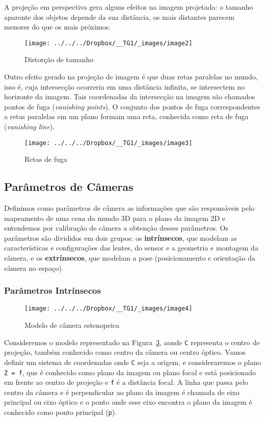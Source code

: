 \documentclass[ecp,tc]{iiufrgs}
\begin{document}
A projeção em perspectiva gera alguns efeitos na imagem projetada: o tamanho aparente dos objetos depende da sua distância, os mais distantes parecem menores do que os mais próximos.

\begin{figure}
	\centering
	\caption{Distorção de tamanho}
	\texttt{[image: ../../../Dropbox/\_\_TG1/\_images/image2]}
	\label{fig:image2}
\end{figure}

Outro efeito gerado na projeção de imagem é que duas retas paralelas no mundo, isso é, cuja intersecção ocorreria em uma distância infinita, se intersectem no horizonte da imagem. Tais coordenadas da intersecção na imagem são chamados pontos de fuga (\textit{vanishing points}). O conjunto dos pontos de fuga correspondentes a retas paralelas em um plano formam uma reta, conhecida como reta de fuga (\textit{vanishing line}).

\begin{figure}
	\centering
	\caption{Retas de fuga}
	\texttt{[image: ../../../Dropbox/\_\_TG1/\_images/image3]}
	\label{fig:image3}
\end{figure}

\subsection{Parâmetros de Câmeras}
Definimos como parâmetros de câmera as informações que são responsáveis pelo mapeamento de uma cena do mundo 3D para o plano da imagem 2D e entendemos por calibração de câmera a obtenção desses parâmetros. Os parâmetros são divididos em dois grupos: os \textbf{intrínsecos}, que modelam as características e configurações das lentes, do sensor e a geometria e montagem da câmera, e os \textbf{extrínsecos}, que modelam a pose (posicionamento e orientação da câmera no espaço).

\subsubsection{Parâmetros Intrínsecos}

\begin{figure}
	\centering
	\caption{Modelo de câmera estenopeica}
	\texttt{[image: ../../../Dropbox/\_\_TG1/\_images/image4]}
	\label{fig:image4}
\end{figure}

Consideremos o modelo representado na Figura~\ref{fig:image4}, aonde \texttt{C} representa o centro de projeção, também conhecido como centro da câmera ou centro óptico. Vamos definir um sistema de coordenadas onde \texttt{C} seja a origem, e consideraremos o plano \texttt{Z = f}, que é conhecido como plano da imagem ou plano focal e está posicionado em frente ao centro de projeção e \texttt{f} é a distância focal. A linha que passa pelo centro da câmera e é perpendicular ao plano da imagem é chamada de eixo principal ou eixo óptico e o ponto onde esse eixo encontra o plano da imagem é conhecido como ponto principal (\texttt{p}).
\end{document}
